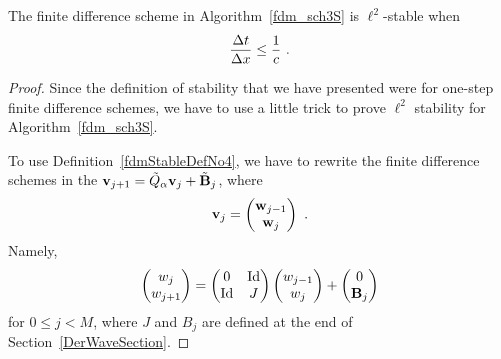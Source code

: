 \begin{prop}\label{CFLCondProp}
The finite difference scheme in Algorithm~\ref{fdm_sch3S} is
$\ell^2$-stable when
\[
\frac{\Delta{t}}{\Delta{x}} \leq \frac{1}{c} \ .
\]
\end{prop}

\begin{proof}
Since the definition of stability that we have presented were for
one-step finite difference schemes, we have to use a little trick to
prove $\ell^2$ stability for Algorithm~\ref{fdm_sch3S}.

To use Definition~\ref{fdmStableDefNo4}, we have to rewrite the finite
difference schemes in the
$\mathbf{v}_{j+1} = \tilde{Q}_\alpha\mathbf{v}_j + \tilde{\mathbf{B}}_j$,
where 
\[
\mathbf{v}_j = \begin{pmatrix} \mathbf{w}_{j-1} \\ \mathbf{w}_j \end{pmatrix} \ .
\]
Namely,
\[
\begin{pmatrix}
w_j \\ w_{j+1}
\end{pmatrix}
=
\begin{pmatrix}
0 & \operatorname{Id} \\ \operatorname{Id} & J  \\ 
\end{pmatrix}
\begin{pmatrix}
w_{j-1} \\ w_j
\end{pmatrix}
+
\begin{pmatrix}
0 \\ \mathbf{B}_j
\end{pmatrix}
\]
for $0 \leq j < M$, where $J$ and $B_j$ are defined at the end of
Section~\ref{DerWaveSection}.


\end{proof}
